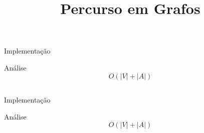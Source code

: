 \title{Percurso em Grafos}
\section{\inserttitle}

\frame{\maketitle}

\subsection{\insertlecture}

\begin{frame}{\insertlecture}

\begin{center}
\begin{tikzpicture}[]

\end{tikzpicture}
\end{center}

\end{frame}

\begin{frame}{\insertlecture}{Implementação}
  
\end{frame}

\begin{frame}{Análise}{\insertlecture}
  $$O(|V| + |A|)$$
\end{frame}

\subsection{\insertlecture}

\begin{frame}{\insertlecture}

\begin{center}
\begin{tikzpicture}[]

\end{tikzpicture}
\end{center}

\end{frame}

\begin{frame}{\insertlecture}{Implementação}
  
\end{frame}

\begin{frame}{Análise}{\insertlecture}
  $$O(|V| + |A|)$$
\end{frame}
